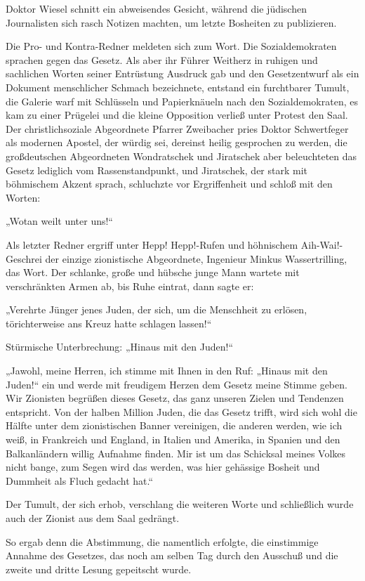 Doktor Wiesel schnitt ein abweisendes Gesicht, während die
jüdischen Journalisten sich rasch Notizen machten, um letzte
Bosheiten zu publizieren.

Die Pro- und Kontra-Redner meldeten sich zum Wort. Die
Sozialdemokraten sprachen gegen das Gesetz. Als aber ihr Führer
Weitherz in ruhigen und sachlichen Worten seiner Entrüstung
Ausdruck gab und den Gesetzentwurf als ein Dokument menschlicher
Schmach bezeichnete, entstand ein furchtbarer Tumult, die Galerie
warf mit Schlüsseln und Papierknäueln nach den Sozialdemokraten, es
kam zu einer Prügelei und die kleine Opposition verließ unter
Protest den Saal. Der christlichsoziale Abgeordnete Pfarrer
Zweibacher pries Doktor Schwertfeger als modernen Apostel, der
würdig sei, dereinst heilig gesprochen zu werden, die großdeutschen
Abgeordneten Wondratschek und Jiratschek aber beleuchteten das
Gesetz lediglich vom Rassenstandpunkt, und Jiratschek, der stark
mit böhmischem Akzent sprach, schluchzte vor Ergriffenheit und
schloß mit den Worten:

„Wotan weilt unter uns!“

Als letzter Redner ergriff unter Hepp! Hepp!-Rufen und höhnischem
Aih-Wai!-Geschrei der einzige zionistische Abgeordnete, Ingenieur
Minkus Wassertrilling, das Wort. Der schlanke, große und hübsche
junge Mann wartete  mit verschränkten Armen ab, bis
Ruhe eintrat, dann sagte er:

„Verehrte Jünger jenes Juden, der sich, um die Menschheit zu
erlösen, törichterweise ans Kreuz hatte schlagen lassen!“

Stürmische Unterbrechung: „Hinaus mit den Juden!“

„Jawohl, meine Herren, ich stimme mit Ihnen in den Ruf: „Hinaus mit
den Juden!“ ein und werde mit freudigem Herzen dem Gesetz meine
Stimme geben. Wir Zionisten begrüßen dieses Gesetz, das ganz
unseren Zielen und Tendenzen entspricht. Von der halben Million
Juden, die das Gesetz trifft, wird sich wohl die Hälfte unter dem
zionistischen Banner vereinigen, die anderen werden, wie ich weiß,
in Frankreich und England, in Italien und Amerika, in Spanien und
den Balkanländern willig Aufnahme finden. Mir ist um das Schicksal
meines Volkes nicht bange, zum Segen wird das werden, was hier
gehässige Bosheit und Dummheit als Fluch gedacht hat.“

Der Tumult, der sich erhob, verschlang die weiteren Worte und
schließlich wurde auch der Zionist aus dem Saal gedrängt.

So ergab denn die Abstimmung, die namentlich erfolgte, die
einstimmige Annahme des Gesetzes, das noch am selben Tag durch den
Ausschuß und die zweite und dritte Lesung gepeitscht wurde.

